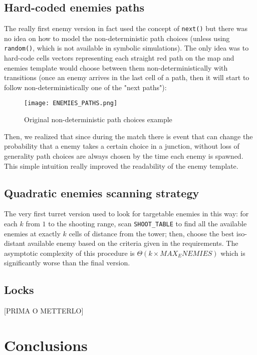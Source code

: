 \documentclass[
10pt, %
a4paper, %
oneside, %
headinclude,footinclude, %
BCOR5mm, %
]{scrartcl}
\begin{document}
\subsection{Hard-coded enemies paths}
The really first enemy version in fact used the concept of \texttt{next()} but there was no idea on how to model the non-deterministic path choices (unless using \texttt{random()}, which is not available in symbolic simulations). The only idea was to hard-code cells vectors representing each straight red path on the map and enemies template would choose between them non-deterministically with transitions (once an enemy arrives in the last cell of a path, then it will start to follow non-deterministically one of the "next paths"):

\begin{figure}[h!]
	\centering
	\texttt{[image: ENEMIES\_PATHS.png]}
	\caption{Original non-deterministic path choices example}
\end{figure}
Then, we realized that since during the match there is event that can change the probability that a enemy takes a certain choice in a junction, without loss of generality path choices are always chosen by the time each enemy is spawned. This simple intuition really improved the readability of the enemy template.
\subsection{Quadratic enemies scanning strategy}
The very first turret version used to look for targetable enemies in this way: for each $k$ from $1$ to the shooting range, scan \texttt{SHOOT\_TABLE} to find all the available enemies at exactly $k$ cells of distance from the tower; then, choose the best iso-distant available enemy based on the criteria given in the requirements. The asymptotic complexity of this procedure is $\Theta(k\times MAX_ENEMIES)$ which is significantly worse than the final version.
\subsection{Locks}
[PRIMA O METTERLO]
\section{Conclusions}

\renewcommand{\refname}{\spacedlowsmallcaps{References}} %




\end{document}

